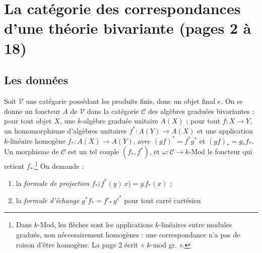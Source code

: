 \documentclass[11pt,a4paper]{article}
\begin{document}
\section*{La catégorie des correspondances d'une théorie bivariante (pages 2 à 18)}

\subsection*{Les données}

Soit $\mathcal{V}$ une catégorie possédant les produits finis, donc un objet
final $e$. On se donne un foncteur $A$ de $\mathcal{V}$ dans la catégorie
$\mathcal{C}$ des algèbres graduées bivariantes : pour tout objet $X$, une
$k$-algèbre graduée unitaire $A(X)$ ; pour tout $f \colon X \to Y$, un
homomorphisme d'algèbres unitaires $f^{*} \colon A(Y) \to A(X)$ et une
application $k$-linéaire homogène $f_{*} \colon A(X) \to A(Y)$, avec
$(gf)^{*} = f^{*} g^{*}$ et $(gf)_{*} = g_{*} f_{*}$. Un morphisme de
$\mathcal{C}$ est un tel couple $(f_{*}, f^{*})$, et
$\omega \colon \mathcal{C} \to k\text{-Mod}$ le foncteur qui retient
$f_{*}$.\footnote{Dans $k\text{-Mod}$, les flèches sont les applications
$k$-linéaires entre modules gradués, non nécessairement homogènes : une
correspondance n'a pas de raison d'être homogène. La page 2 écrit « $k$-mod
gr. ».} On demande :

\begin{enumerate}
  \item[(P)] la \emph{formule de projection}
  $f_{*}\bigl(f^{*}(y)\, x\bigr) = y\, f_{*}(x)$ ;
  \item[(E)] la \emph{formule d'échange} $g^{*} f_{*} = f'_{*}\, g'^{*}$ pour
  tout carré cartésien
\end{enumerate}

\end{document}
